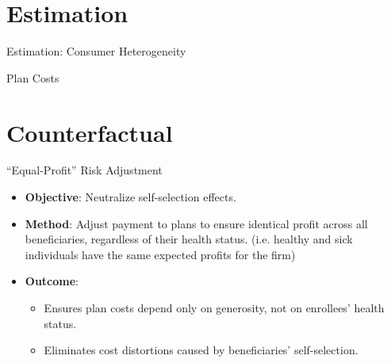 \documentclass[professionalfonts, aspectratio=169]{beamer}
\begin{document}
\section{Estimation}

\begin{frame}{Estimation: Consumer Heterogeneity}
  
\end{frame}





\begin{frame}{Plan Costs}
  
\end{frame}

\section{Counterfactual}

\begin{frame}{``Equal-Profit'' Risk Adjustment}
  \begin{itemize}
    \item \textbf{Objective}: Neutralize self-selection effects.
    \item \textbf{Method}: 
    Adjust payment to plans to ensure identical profit across all beneficiaries, regardless of their health status. (i.e. healthy and sick individuals have the same expected profits for the firm)
    \item \textbf{Outcome}:
      \begin{itemize}
        \item Ensures plan costs depend only on generosity, not on enrollees' health status.
        \item Eliminates cost distortions caused by beneficiaries' self-selection.
      \end{itemize}
  \end{itemize}
\end{frame}
\end{document}
